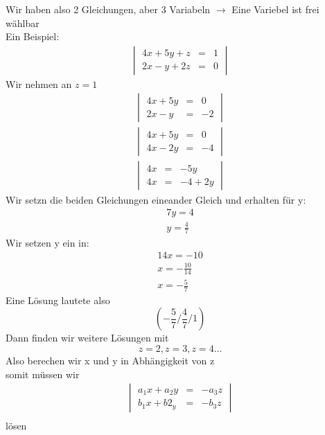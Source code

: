 Wir haben also 2 Gleichungen, aber 3 Variabeln $\to$ Eine Variebel ist frei wählbar\\
Ein Beispiel:
\begin{eqnarray*}
	\begin{vmatrix}4x + 5y + z &=& 1 \\ 
	2x-y+2z &=& 0 \end{vmatrix}
\end{eqnarray*}
Wir nehmen an $z = 1$
\begin{eqnarray*}
	\begin{vmatrix}4x + 5y &=& 0 \\ 
	2x-y &=& -2 \end{vmatrix}\\
	\begin{vmatrix}4x + 5y &=& 0 \\ 
	4x-2y &=& -4 \end{vmatrix}\\
	\begin{vmatrix}4x  &=& -5y \\ 
	4x&=& -4 + 2y\end{vmatrix}
\end{eqnarray*}
Wir setzn die beiden Gleichungen eineander Gleich und erhalten für y:
\begin{eqnarray*}
	7y = 4\\
	y = \frac{4}{7}
\end{eqnarray*}
Wir setzen y ein in:
\begin{eqnarray*}
	14x = -10\\
	x = -\frac{10}{14}\\
	x = -\frac{5}{7}
\end{eqnarray*}
Eine Lösung lautete also
\begin{equation*}(-\frac{5}{7} / \frac{4}{7} / 1)\end{equation*}
Dann finden wir weitere Lösungen mit 
\begin{equation*}z=2, z=3,z=4 \ldots\end{equation*}
Also berechen wir x und y in Abhängigkeit von z\\
somit müssen wir 
\begin{eqnarray*}
	\begin{vmatrix}a_1x + a_2y &=& - a_3z\\ 
	b_1x+b2_y &=& -b_3z\end{vmatrix}\\
\end{eqnarray*}
lösen\\
\\
